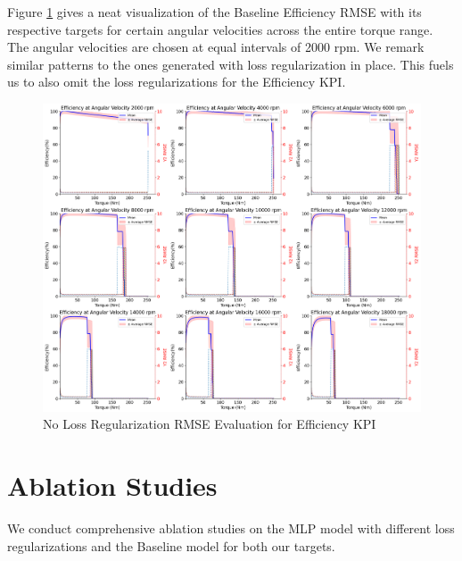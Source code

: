 \documentclass{report} %
\begin{document}
Figure \ref{fig:No Loss Regularization RMSE Evaluation for Efficiency KPI} gives a neat visualization of the Baseline Efficiency \ac{RMSE} with its respective targets 
for certain angular velocities across the entire torque range. The angular velocities are chosen at equal intervals of 2000 rpm.
We remark similar patterns to the ones generated with loss regularization in place. This fuels us to also omit the loss regularizations for the Efficiency \ac{KPI}.
\begin{figure}[H]
    \centering
    \includegraphics[width=1\textwidth]{./ReportImages/rmse_eta_no_lossreg_MLP.png} 
    \caption{No Loss Regularization \ac{RMSE} Evaluation for Efficiency \ac{KPI}} 
    \label{fig:No Loss Regularization RMSE Evaluation for Efficiency KPI}
\end{figure}

\section{Ablation Studies}\label{sec:Ablation Studies}

We conduct comprehensive ablation studies on the \ac{MLP} model with different loss regularizations and the Baseline model for both our targets.
\end{document}
